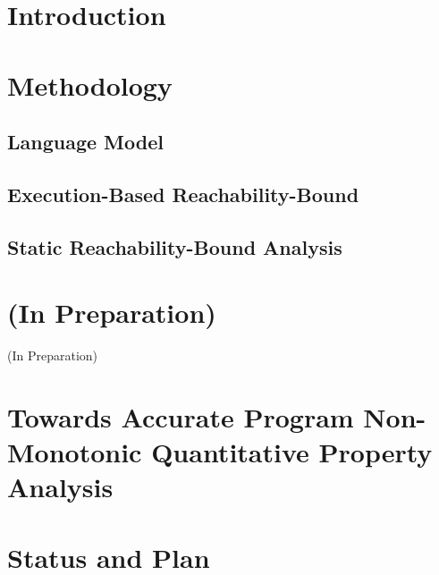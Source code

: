 \documentclass[a4paper,11pt]{article}
\begin{document}
\section{Introduction}
\label{sec:reachability-intro}


\section{Methodology}
\label{sec:reachability-analysis}

\subsection{{Language Model}}
\label{sec:language}

\subsection{{Execution-Based Reachability-Bound}}
\label{sec:reachability-exe}

\subsection{{Static Reachability-Bound Analysis}}
\label{sec:reachability-static}



\section*{(In Preparation)}
{\protect\numberline{}(In Preparation)}%

\section{Towards Accurate Program Non-Monotonic Quantitative Property Analysis }
\label{sec:generalization}


% 

\section{Status and Plan }
\label{sec:status-plan}




\end{document}
